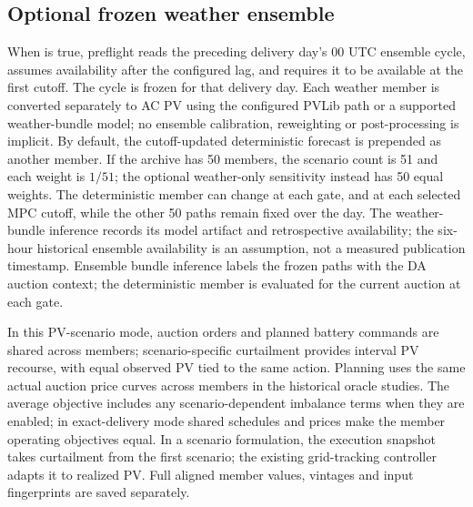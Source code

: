 \documentclass[11pt,a4paper]{article}
\begin{document}
\subsection{Optional frozen weather ensemble}
When  is true, preflight reads
the preceding delivery day's 00 UTC ensemble cycle, assumes availability after
the configured lag, and requires it to be available at the first cutoff. The
cycle is frozen for that delivery day. Each weather member is converted separately
to AC PV using the configured PVLib path or a supported weather-bundle model;
no ensemble calibration, reweighting or post-processing is implicit. By default,
the cutoff-updated deterministic forecast is prepended as another member. If the
archive has 50 members, the scenario count is 51 and each weight is $1/51$;
the optional weather-only sensitivity instead has 50 equal weights.
The deterministic member can change at each gate, and at each selected MPC
cutoff, while the other 50 paths
remain fixed over the day. The weather-bundle inference records its model
artifact and retrospective availability; the six-hour historical ensemble
availability is an assumption, not a measured publication timestamp. Ensemble
bundle inference labels the frozen paths with the DA auction context; the
deterministic member is evaluated for the current auction at each gate.

In this PV-scenario mode, auction orders and planned battery commands are
shared across members; scenario-specific curtailment provides interval PV
recourse, with equal observed PV tied to the same action. Planning uses the same
actual auction price curves across members in the historical oracle studies.
The average objective includes any scenario-dependent imbalance terms when they
are enabled; in exact-delivery mode shared schedules and prices make the
member operating objectives equal. In a scenario formulation, the execution
snapshot takes curtailment from the first scenario; the existing grid-tracking
controller adapts it to realized PV. Full aligned member values,
vintages and input fingerprints are saved separately.
\end{document}
